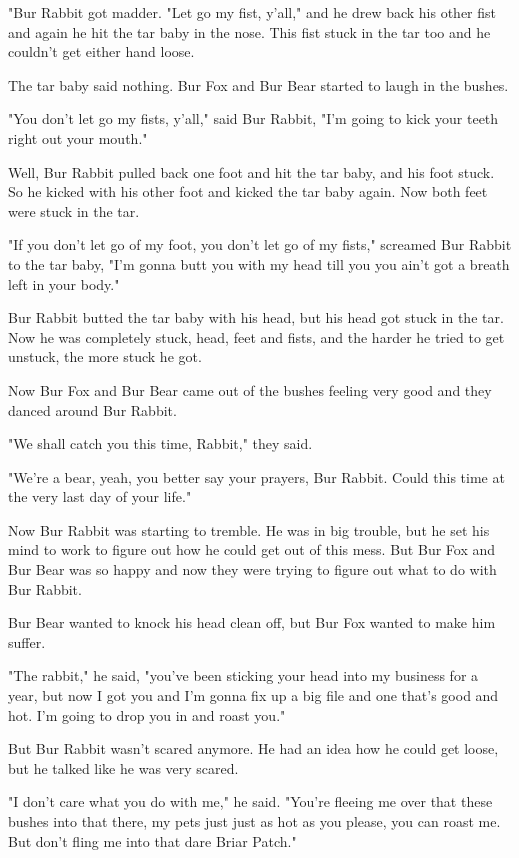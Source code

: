 "Bur Rabbit got madder. "Let go my fist, y'all," and he drew back his other fist and again he hit the tar baby in the nose. This fist stuck in the tar too and he couldn't get either hand loose.

The tar baby said nothing. Bur Fox and Bur Bear started to laugh in the bushes.

"You don't let go my fists, y'all," said Bur Rabbit, "I'm going to kick your teeth right out your mouth."

Well, Bur Rabbit pulled back one foot and hit the tar baby, and his foot stuck. So he kicked with his other foot and kicked the tar baby again. Now both feet were stuck in the tar.

"If you don't let go of my foot, you don't let go of my fists," screamed Bur Rabbit to the tar baby, "I'm gonna butt you with my head till you you ain't got a breath left in your body."

Bur Rabbit butted the tar baby with his head, but his head got stuck in the tar. Now he was completely stuck, head, feet and fists, and the harder he tried to get unstuck, the more stuck he got.

Now Bur Fox and Bur Bear came out of the bushes feeling very good and they danced around Bur Rabbit.

"We shall catch you this time, Rabbit," they said.

"We're a bear, yeah, you better say your prayers, Bur Rabbit. Could this time at the very last day of your life."

Now Bur Rabbit was starting to tremble. He was in big trouble, but he set his mind to work to figure out how he could get out of this mess. But Bur Fox and Bur Bear was so happy and now they were trying to figure out what to do with Bur Rabbit.

Bur Bear wanted to knock his head clean off, but Bur Fox wanted to make him suffer.

"The rabbit," he said, "you've been sticking your head into my business for a year, but now I got you and I'm gonna fix up a big file and one that's good and hot. I'm going to drop you in and roast you."

But Bur Rabbit wasn't scared anymore. He had an idea how he could get loose, but he talked like he was very scared.

"I don't care what you do with me," he said. "You're fleeing me over that these bushes into that there, my pets just just as hot as you please, you can roast me. But don't fling me into that dare Briar Patch."

